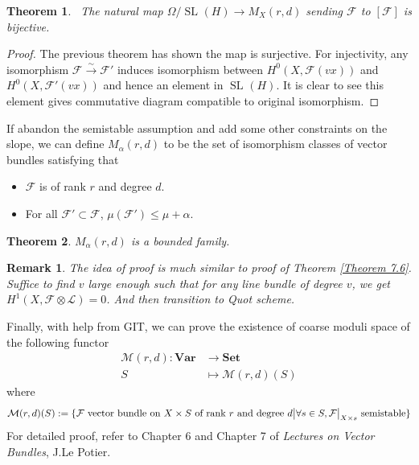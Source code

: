 \documentclass{ctexart}
\newtheorem{remark}{Remark}[section]
\newtheorem{theorem}{Theorem}[section]
\newcommand{\sets}{\mathbf{Set}}
\newcommand{\variety}{\mathbf{Var}}
\newcommand{\speciallineargroup}[2]{\operatorname{SL}_{#1}(#2)}
\begin{document}
\begin{theorem}\
    The natural map $\Omega/\speciallineargroup{}{H} \rightarrow M_{X}(r, d)$ sending $\mathcal{F}$ to $[\mathcal{F}]$ is bijective.
    \label{Theorem 7.7}
\end{theorem}
\begin{proof}
    The previous theorem has shown the map is surjective.
    For injectivity, any isomorphism $\mathcal{F} \overset{\sim}{\rightarrow} \mathcal{F}'$ induces isomorphism between $H^{0}(X, \mathcal{F}(vx))$ and $H^{0}(X, \mathcal{F}'(vx))$ and hence an element in $\speciallineargroup{}{H}$.
    It is clear to see this element gives commutative diagram compatible to original isomorphism.
\end{proof}
If abandon the semistable assumption and add some other constraints on the slope, we can define $M_{\alpha}(r, d)$ to be the set of isomorphism classes of vector bundles satisfying that
\begin{itemize}
    \item $\mathcal{F}$ is of rank $r$ and degree $d$.
    \item For all $\mathcal{F}' \subset \mathcal{F}$, $\mu(\mathcal{F}') \le \mu + \alpha$.
\end{itemize}
\begin{theorem}
    $M_{\alpha}(r, d)$ is a bounded family.
    \label{Theorem 7.8}
\end{theorem}
\begin{remark}
    The idea of proof is much similar to proof of Theorem \ref{Theorem 7.6}.
    Suffice to find $v$ large enough such that for any line bundle of degree $v$, we get $H^{1}(X, \mathcal{F} \otimes \mathcal{L}) = 0$.
    And then transition to Quot scheme.
\end{remark}
Finally, with help from GIT, we can prove the existence of coarse moduli space of the following functor
\begin{equation}
    \begin{split}
        \mathcal{M}(r, d): \variety & \longrightarrow \sets \\
        S & \longmapsto \mathcal{M}(r, d)(S)
    \end{split}
\end{equation}
where
\begin{equation*}
    \mathcal{M}(r, d)(S) := \{\mathcal{F} \text{ vector bundle on } X \times S \text{ of rank $r$ and degree $d$} \big{|} \forall s\in S, \mathcal{F}\big{|}_{X \times s} \text{ semistable}\}
\end{equation*}
For detailed proof, refer to Chapter 6 and Chapter 7 of \emph{Lectures on Vector Bundles}, J.Le Potier.
\end{document}
